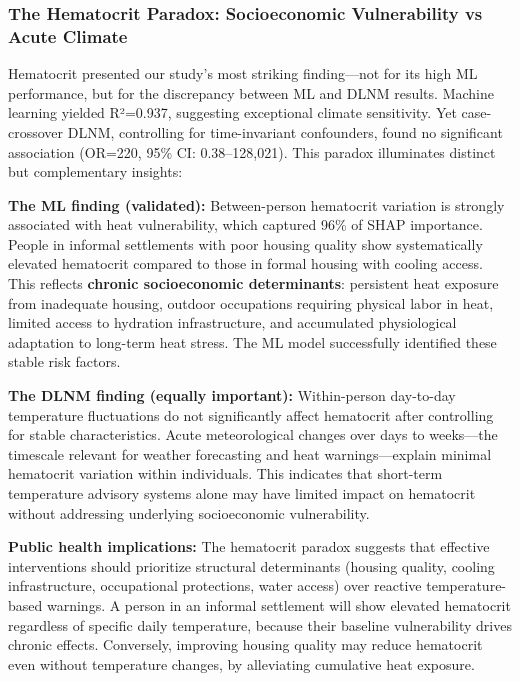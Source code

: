 \subsubsection{The Hematocrit Paradox: Socioeconomic Vulnerability vs Acute Climate}

Hematocrit presented our study's most striking finding---not for its high ML performance, but for the discrepancy between ML and DLNM results. Machine learning yielded R²=0.937, suggesting exceptional climate sensitivity. Yet case-crossover DLNM, controlling for time-invariant confounders, found no significant association (OR=220, 95\% CI: 0.38--128,021). This paradox illuminates distinct but complementary insights:

\textbf{The ML finding (validated):} Between-person hematocrit variation is strongly associated with heat vulnerability, which captured 96\% of SHAP importance. People in informal settlements with poor housing quality show systematically elevated hematocrit compared to those in formal housing with cooling access. This reflects \textbf{chronic socioeconomic determinants}: persistent heat exposure from inadequate housing, outdoor occupations requiring physical labor in heat, limited access to hydration infrastructure, and accumulated physiological adaptation to long-term heat stress. The ML model successfully identified these stable risk factors.

\textbf{The DLNM finding (equally important):} Within-person day-to-day temperature fluctuations do not significantly affect hematocrit after controlling for stable characteristics. Acute meteorological changes over days to weeks---the timescale relevant for weather forecasting and heat warnings---explain minimal hematocrit variation within individuals. This indicates that short-term temperature advisory systems alone may have limited impact on hematocrit without addressing underlying socioeconomic vulnerability.

\textbf{Public health implications:} The hematocrit paradox suggests that effective interventions should prioritize structural determinants (housing quality, cooling infrastructure, occupational protections, water access) over reactive temperature-based warnings. A person in an informal settlement will show elevated hematocrit regardless of specific daily temperature, because their baseline vulnerability drives chronic effects. Conversely, improving housing quality may reduce hematocrit even without temperature changes, by alleviating cumulative heat exposure.

